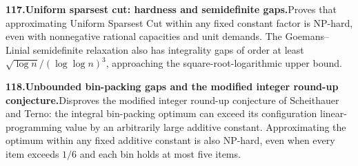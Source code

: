 \documentclass[11pt,a4paper]{article}
\begin{document}
  \par \begin{minipage}{\linewidth}
  \fontsize{10.5}{12.6}\selectfont\RaggedRight
  \hypertarget{result 117}{}
  {\bfseries\textcolor{muted}{117.}\enspace Uniform sparsest cut: hardness and semidefinite gaps.}\enspace Proves that approximating Uniform Sparsest Cut within any fixed constant factor is NP-hard, even with nonnegative rational capacities and unit demands. The Goemans--Linial semidefinite relaxation also has integrality gaps of order at least $\sqrt{\log n}/(\log\log n)^3$, approaching the square-root-logarithmic upper bound.\par
  \end{minipage}\par\vspace{5pt}



  \par \begin{minipage}{\linewidth}
  \fontsize{10.5}{12.6}\selectfont\RaggedRight
  \hypertarget{result 118}{}
  {\bfseries\textcolor{muted}{118.}\enspace Unbounded bin-packing gaps and the modified integer round-up conjecture.}\enspace Disproves the modified integer round-up conjecture of Scheithauer and Terno: the integral bin-packing optimum can exceed its configuration linear-programming value by an arbitrarily large additive constant. Approximating the optimum within any fixed additive constant is also NP-hard, even when every item exceeds $1/6$ and each bin holds at most five items.\par
  \end{minipage}\par\vspace{5pt}
\end{document}
